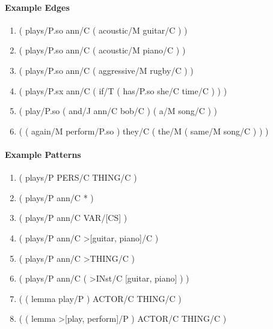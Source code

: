\documentclass[11pt]{scrreprt}
\begin{document}
\paragraph{Example Edges}
\begin{enumerate}[label={$e_{\arabic*}$ = }]
	\item \textsf{( plays/P.so ann/C ( acoustic/M guitar/C ) )}
	\item \textsf{( plays/P.so ann/C ( acoustic/M piano/C ) )}
	\item \textsf{( plays/P.so ann/C ( aggressive/M rugby/C ) )}
	\item \textsf{( plays/P.sx ann/C ( if/T ( has/P.so she/C time/C ) ) )}
	\item \textsf{( play/P.so ( and/J ann/C bob/C ) ( a/M song/C ) )}
	\item \textsf{( ( again/M perform/P.so ) they/C ( the/M ( same/M song/C ) ) )}
\end{enumerate}


\paragraph{Example Patterns}
\begin{enumerate}[label={$p_{\arabic*}$ = }]
	\item \textsf{( plays/P PERS/C THING/C )}
	\item \textsf{( plays/P ann/C * )} 
	\item \textsf{( plays/P ann/C VAR/[CS] )}
	\item \textsf{( plays/P ann/C >[guitar, piano]/C )}
	\item \textsf{( plays/P ann/C >THING/C )}
	\item \textsf{( plays/P ann/C ( >IN\gls{st}/C [guitar, piano] ) )}
	\item \textsf{( ( lemma play/P ) ACTOR/C THING/C )}
	\item \textsf{( ( lemma >[play, perform]/P ) ACTOR/C THING/C )}
\end{enumerate}
\end{document}
